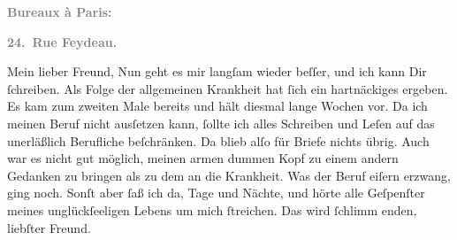 \pstart
           \begin{otherlanguage}{french}\textcolor{gray}{\textbf{\textbf{Bureaux à Paris:}}}\end{otherlanguage}\pend
           
\pstart
           \begin{otherlanguage}{french}\textcolor{gray}{\textbf{\textbf{24. Rue Feydeau.}}}\end{otherlanguage}\pend
           
\pstart{}Mein lieber Freund,\pend\vspace{0.5em}
\pstart
           Nun geht es mir langſam wieder beſſer, und ich kann Dir ſchreiben. Als Folge der
               allgemeinen Krankheit hat ſich ein hartnäckiges \label{K_L02729-1v}\label{K_L02729-1}
               ergeben. Es kam zum zweiten Male bereits und hält diesmal lange Wochen vor. Da ich
               meinen Beruf nicht ausſetzen kann, ſollte ich alles Schreiben und Leſen auf das
               unerläßlich Berufliche beſchränken. Da blieb alſo für Briefe nichts übrig. Auch war
               es nicht gut möglich, meinen armen dummen Kopf zu einem andern Gedanken zu bringen
               als zu dem an die Krankheit. Was der Beruf eiſern {\pb}erzwang,  ging noch. Sonſt aber ſaß ich da,
               Tage und Nächte, und hörte alle Geſpenſter meines unglückſeeligen Lebens um mich
               ſtreichen. Das wird ſchlimm enden, liebſter Freund.\pend
           
